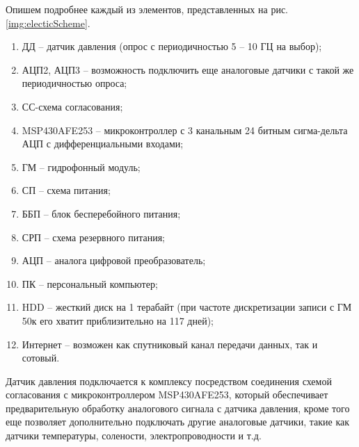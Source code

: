 Опишем подробнее каждый из элементов, представленных на рис. \ref{img:electicScheme}.
\begin{enumerate}
  \item ДД – датчик давления (опрос с периодичностью 5 – 10 ГЦ на выбор);
  \item АЦП2, АЦП3 – возможность подключить еще аналоговые датчики с такой же периодичностью опроса;
  \item СС-схема согласования;
  \item MSP430AFE253 – микроконтроллер с 3 канальным 24 битным сигма-дельта АЦП с дифференциальными входами;
  \item ГМ – гидрофонный модуль;
  \item СП – схема питания;
  \item ББП – блок бесперебойного питания;
  \item СРП – схема резервного питания;
  \item АЦП – аналога цифровой преобразователь;
  \item ПК – персональный компьютер;
  \item HDD – жесткий диск на 1 терабайт (при частоте дискретизации записи с ГМ 50к его хватит приблизительно на 117 дней);
  \item Интернет – возможен как спутниковый канал передачи данных, так и сотовый.
\end{enumerate}

Датчик давления подключается к комплексу посредством соединения схемой согласования с микроконтроллером MSP430AFE253, который обеспечивает предварительную обработку аналогового сигнала с датчика давления, кроме того еще позволяет дополнительно подключать другие аналоговые датчики, такие как датчики температуры, солености, электропроводности и т.д.

